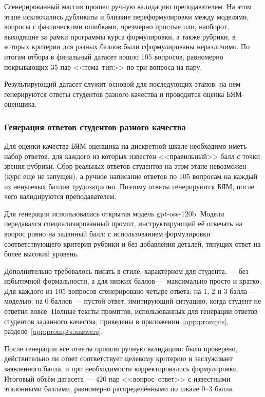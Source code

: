 Сгенерированный массив прошел ручную валидацию преподавателем. На этом
этапе исключались дубликаты и близкие переформулировки между моделями,
вопросы с фактическими ошибками, чрезмерно простые или, наоборот, выходящие
за рамки программы курса формулировки, а также рубрики, в которых критерии
для разных баллов были сформулированы неразличимо. По итогам отбора в
финальный датасет вошло 105 вопросов, равномерно покрывающих 35 пар
<<тема--тип>> по три вопроса на пару.

Результирующий датасет служит основой для последующих этапов: на нём
генерируются ответы студентов разного качества и проводится оценка
БЯМ-оценщика.

\subsubsection{Генерация ответов студентов разного качества}

Для оценки качества БЯМ-оценщика на дискретной шкале необходимо иметь набор
ответов, для каждого из которых известен <<правильный>> балл с точки зрения
рубрики. Сбор реальных ответов студентов на этом этапе невозможен (курс ещё
не запущен), а ручное написание ответов по 105 вопросам на каждый из
ненулевых баллов трудозатратно. Поэтому ответы генерируются БЯМ, после чего
валидируются преподавателем.

Для генерации использовалась открытая модель gpt-oss-120b. Модели передавался специализированный промпт, 
инструктирующий её отвечать на вопрос ровно на заданный балл: с использованием формулировки
соответствующего критерия рубрики и без добавления деталей, тянущих ответ
на более высокий уровень. 

Дополнительно требовалось писать в стиле,
характерном для студента, --- без избыточной формальности, а для низких
баллов --- максимально просто и кратко. Для каждого из 105 вопросов
сгенерировано четыре ответа: на 1, 2 и 3 балла --- моделью; на 0 баллов ---
пустой ответ, имитирующий ситуацию, когда студент не ответил вовсе.
Полные тексты промптов, использованных для генерации ответов студентов
заданного качества, приведены в приложении~\ref{app:prompts}, разделе~\ref{app:prompts:answers}.

После генерации все ответы прошли ручную валидацию: было проверено, 
действительно ли ответ соответствует целевому критерию и
заслуживает заявленного балла, и при необходимости корректировались
формулировки. Итоговый объём датасета --- 420 пар <<вопрос--ответ>> с
известными эталонными баллами, равномерно распределёнными по шкале
0--3 балла.


